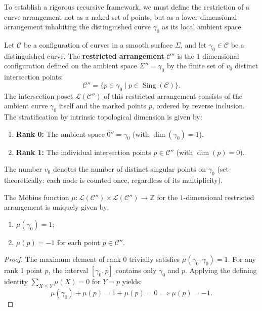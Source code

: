 \documentclass[article,11pt]{amsart} \numberwithin{equation}{section}
\numberwithin{equation}{section}
\begin{document}
{To establish a rigorous recursive framework, we must define the restriction of a curve arrangement not as a naked set of points, but as a lower-dimensional arrangement inhabiting the distinguished curve $\gamma_0$ as its local ambient space.

\begin{df}\label{def8.7}
	Let $\mathcal{C}$ be a configuration of curves in a smooth surface $\Sigma$, and let $\gamma_0 \in \mathcal{C}$ be a distinguished curve. The \textbf{restricted arrangement} $\mathcal{C}''$ is the $1$-dimensional configuration defined on the ambient space $\Sigma'' = \gamma_0$ by the finite set of $v_0$ distinct intersection points:
	\[
	\mathcal{C}'' = \{p \in \gamma_0 \mid p \in \operatorname{Sing}(\mathcal{C})\}.
	\]
	The intersection poset $\mathcal{L}(\mathcal{C}'')$ of this restricted arrangement consists of the ambient curve $\gamma_0$ itself and the marked points $p$, ordered by reverse inclusion. The stratification by intrinsic topological dimension is given by:
	\begin{enumerate}
		\item \textbf{Rank 0:} The ambient space $\hat{0}'' = \gamma_0$ (with $\dim(\gamma_0) = 1$).
		\item \textbf{Rank 1:} The individual intersection points $p \in \mathcal{C}''$ (with $\dim(p) = 0$).
	\end{enumerate}
	The number $v_0$ denotes the number of distinct singular points on $\gamma_0$ (set-theoretically: each node is counted once, regardless of its multiplicity).
\end{df}

\begin{inp}\label{pp87}
	The Möbius function $\mu : \mathcal{L}(\mathcal{C}'') \times \mathcal{L}(\mathcal{C}'') \longrightarrow \mathbb{Z}$ for the $1$-dimensional restricted arrangement is uniquely given by:
	\begin{enumerate}
		\item $\mu(\gamma_0) = 1$;
		\item $\mu(p) = -1$ for each point $p \in \mathcal{C}''$.
	\end{enumerate}
\end{inp}
\begin{proof}
	The maximum element of rank 0 trivially satisfies $\mu(\gamma_0, \gamma_0) = 1$. For any rank 1 point $p$, the interval $[\gamma_0, p]$ contains only $\gamma_0$ and $p$. Applying the defining identity $\sum_{X \le Y} \mu(X) = 0$ for $Y = p$ yields:
	\[
	\mu(\gamma_0) + \mu(p) = 1 + \mu(p) = 0 \implies \mu(p) = -1.
	\]
\end{proof}

}
\end{document}
